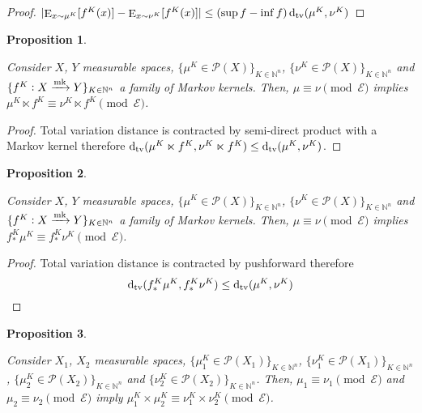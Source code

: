\documentclass{article}
\numberwithin{equation}{section}
\theoremstyle{definition}
\theoremstyle{plain}
\newtheorem{proposition}{Proposition}[section]
\DeclareMathOperator{\E}{E}
\newcommand{\Dtv}{\operatorname{d}_{\textnormal{tv}}}
\newcommand{\Nats}{\mathbb{N}}
\newcommand{\Abs}[1]{\lvert #1 \rvert}
\newcommand{\Fall}{\mathcal{E}}
\newcommand{\Markov}{\xrightarrow{\textnormal{mk}}}
\begin{document}
\begin{proof}

$\Abs{\E_{x \sim \mu^K}[f^K(x)] - \E_{x \sim \nu^K}[f^K(x)]} \leq  (\sup f - \inf f)\Dtv(\mu^K, \nu^K)$
\end{proof}

\begin{samepage}
\begin{proposition}
\label{prp:prob_cong_semidir}

Consider $X$, $Y$ measurable spaces, $\{\mu^K \in \mathcal{P}(X)\}_{K \in \Nats^n}$, $\{\nu^K \in \mathcal{P}(X)\}_{K \in \Nats^n}$ and ${\{f^K: X \Markov Y\}_{K \in \Nats^n}}$ a family of Markov kernels. Then, $\mu \equiv \nu \pmod \Fall$ implies $\mu^K \ltimes f^K \equiv \nu^K \ltimes f^K \pmod \Fall$.

\end{proposition}
\end{samepage}

\begin{proof}

Total variation distance is contracted by semi-direct product with a Markov kernel therefore $\Dtv(\mu^K \ltimes f^K, \nu^K \ltimes f^K) \leq \Dtv(\mu^K, \nu^K)$.
\end{proof}

\begin{samepage}
\begin{proposition}
\label{prp:prob_cong_push}

Consider $X$, $Y$ measurable spaces, $\{\mu^K \in \mathcal{P}(X)\}_{K \in \Nats^n}$, $\{\nu^K \in \mathcal{P}(X)\}_{K \in \Nats^n}$ and ${\{f^K: X \Markov Y\}_{K \in \Nats^n}}$ a family of Markov kernels. Then, $\mu \equiv \nu \pmod \Fall$ implies $f_*^K\mu^K \equiv f_*^K\nu^K \pmod \Fall$.

\end{proposition}
\end{samepage}

\begin{proof}

Total variation distance is contracted by pushforward therefore \[\Dtv(f_*^K\mu^K, f_*^K\nu^K) \leq \Dtv(\mu^K, \nu^K)\]
\end{proof}

\begin{samepage}
\begin{proposition}
\label{prp:prob_cong_dir}

Consider $X_1$, $X_2$ measurable spaces, $\{\mu_1^K \in \mathcal{P}(X_1)\}_{K \in \Nats^n}$, $\{\nu_1^K \in \mathcal{P}(X_1)\}_{K \in \Nats^n}$, $\{\mu_2^K \in \mathcal{P}(X_2)\}_{K \in \Nats^n}$ and $\{\nu_2^K \in \mathcal{P}(X_2)\}_{K \in \Nats^n}$. Then, $\mu_1 \equiv \nu_1 \pmod \Fall$ and $\mu_2 \equiv \nu_2 \pmod \Fall$ imply $\mu_1^K \times \mu_2^K \equiv \nu_1^K \times \nu_2^K \pmod \Fall$. 

\end{proposition}
\end{samepage}
\end{document}
